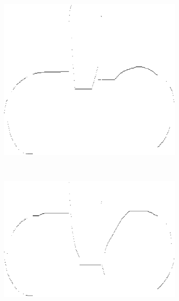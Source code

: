 \begin{figure}
\begin{subfigure}[b]{0.25\textwidth}
\caption{}\label{fig:pasos_mala_seg_rlsa}
\end{subfigure}
~
\begin{subfigure}[b]{0.25\textwidth}
\centering
\includegraphics[width=\textwidth]{images/do_upcont.eps}
\caption{}\label{fig:pasos_mala_seg_sup}
\end{subfigure}\\
\begin{subfigure}[b]{0.25\textwidth}
\centering
\includegraphics[width=\textwidth]{images/do_lowcont.eps}
\caption{}\label{fig:pasos_mala_seg_inf}
\end{subfigure}
~
\begin{subfigure}[b]{0.25\textwidth}

\end{subfigure}
\end{figure}
